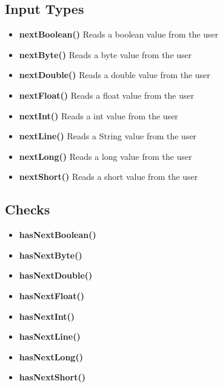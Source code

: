 \documentclass{report}
\begin{document}
    \subsection{Input Types}
    \begin{itemize}
        \item \textbf{nextBoolean()}	Reads a boolean value from the user
        \item \textbf{nextByte()}	Reads a byte value from the user
        \item \textbf{nextDouble()}	Reads a double value from the user
        \item \textbf{nextFloat()}	Reads a float value from the user
        \item \textbf{nextInt()}	Reads a int value from the user
        \item \textbf{nextLine()}	Reads a String value from the user
        \item \textbf{nextLong()}	Reads a long value from the user
        \item \textbf{nextShort()}	Reads a short value from the user
    \end{itemize}

    \bigbreak \noindent 
    \subsection{Checks}
    \begin{itemize}
        \item \textbf{hasNextBoolean()}	
        \item \textbf{hasNextByte()}
        \item \textbf{hasNextDouble()}
        \item \textbf{hasNextFloat()}	
        \item \textbf{hasNextInt()}	
        \item \textbf{hasNextLine()}	
        \item \textbf{hasNextLong()}
        \item \textbf{hasNextShort()}	
    \end{itemize}
\end{document}
